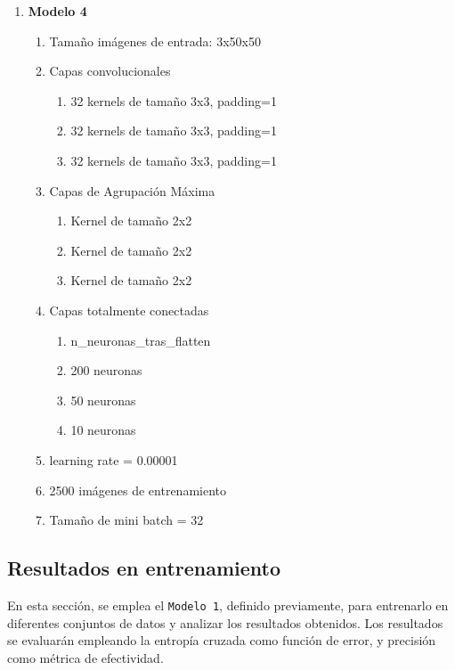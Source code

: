 \begin{enumerate}
	\item \textbf{Modelo 4}
	\begin{enumerate}[label=\textbullet, nosep]
		\item Tamaño imágenes de entrada: 3x50x50
		\item Capas convolucionales
		\begin{enumerate}[label=\textbullet, nosep]
			\item 32 kernels de tamaño 3x3, padding=1
			\item 32 kernels de tamaño 3x3, padding=1
			\item 32 kernels de tamaño 3x3, padding=1
		\end{enumerate}
		\item Capas de Agrupación Máxima
		\begin{enumerate}[label=\textbullet, nosep]
			\item Kernel de tamaño 2x2
			\item Kernel de tamaño 2x2
			\item Kernel de tamaño 2x2
		\end{enumerate}
		\item Capas totalmente conectadas
		\begin{enumerate}[label=\textbullet, nosep]
			\item n\_neuronas\_tras\_flatten
			\item 200 neuronas
			\item 50 neuronas
			\item 10 neuronas
		\end{enumerate}
		\item learning rate = 0.00001
		\item 2500 imágenes de entrenamiento
		\item Tamaño de mini batch = 32
	\end{enumerate}		

	
\end{enumerate}


\subsection{Resultados en entrenamiento}

En esta sección, se emplea el \texttt{Modelo 1}, definido previamente, para entrenarlo en diferentes conjuntos de datos y analizar los resultados obtenidos. Los resultados se evaluarán empleando la entropía cruzada como función de error, y precisión como métrica de efectividad.

